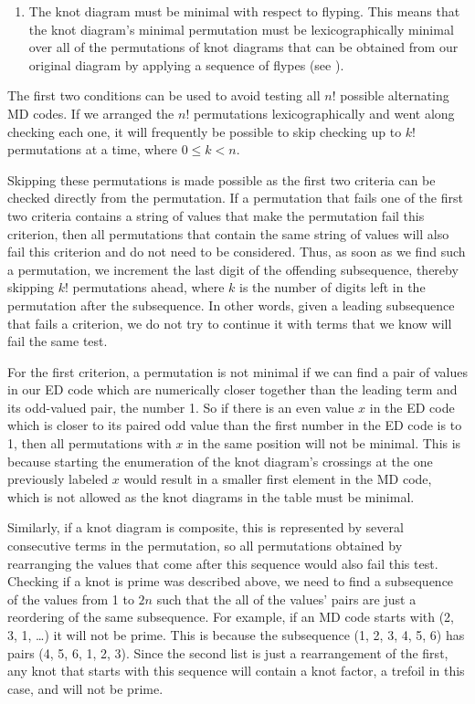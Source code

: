 \begin{paper}
\begin{enumerate}
\item The knot diagram must be minimal with respect to flyping.
This means that the knot diagram's minimal permutation must be lexicographically
minimal over all of the permutations of knot diagrams that can be obtained from
our original diagram by applying a sequence of flypes (see \figMoves).
\end{enumerate}

The first two conditions can be used to avoid testing all $n!$ possible
alternating MD codes.
If we arranged the $n!$ permutations lexicographically and went along checking
each one, it will frequently be possible to skip checking up to $k!$
permutations at a time, where $0\leq k<n$.

Skipping these permutations is made possible as the first two criteria can be
checked directly from the permutation.
If a permutation that fails one of the first two criteria contains a string of
values that make the permutation fail this criterion, then all permutations that
contain the same string of values will also fail this criterion and do not need
to be considered.
Thus, as soon as we find such a permutation, we increment the last digit of the
offending subsequence, thereby skipping $k!$ permutations ahead, where $k$ is
the number of digits left in the permutation after the subsequence.
In other words, given a leading subsequence that fails a criterion, we do not
try to continue it with terms that we know will fail the same test.

For the first criterion, a permutation is not minimal if we can find a pair of
values in our ED code which are numerically closer together than the leading
term and its odd-valued pair, the number 1.
So if there is an even value $x$ in the ED code which is closer to its paired
odd value than the first number in the ED code is to 1, then all permutations
with $x$ in the same position will not be minimal.
This is because starting the enumeration of the knot diagram's crossings at the
one previously labeled $x$ would result in a smaller first element in the MD
code, which is not allowed as the knot diagrams in the table must be minimal.


Similarly, if a knot diagram is composite, this is represented by several
consecutive terms in the permutation, so all permutations obtained by
rearranging the values that come after this sequence would also fail this test.
Checking if a knot is prime was described above, we need to find a subsequence
of the values from 1 to $2n$ such that the all of the values' pairs are just a
reordering of the same subsequence.
For example, if an MD code starts with (2, 3, 1, \dots) it will not be prime.
This is because the subsequence (1, 2, 3, 4, 5, 6) has pairs (4, 5, 6, 1, 2, 3).
Since the second list is just a rearrangement of the first, any knot that starts
with this sequence will contain a knot factor, a trefoil in this case, and will
not be prime.


\end{paper}
